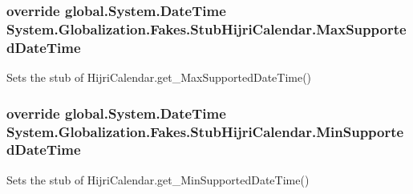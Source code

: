 \hypertarget{class_system_1_1_globalization_1_1_fakes_1_1_stub_hijri_calendar_aabc75d2939465623b6f738a824891f11}{
\subsubsection[{Max\-Supported\-Date\-Time}]{\setlength{\rightskip}{0pt plus 5cm}override global.\-System.\-Date\-Time System.\-Globalization.\-Fakes.\-Stub\-Hijri\-Calendar.\-Max\-Supported\-Date\-Time\hspace{0.3cm}{\ttfamily [get]}}}\label{class_system_1_1_globalization_1_1_fakes_1_1_stub_hijri_calendar_aabc75d2939465623b6f738a824891f11}


Sets the stub of Hijri\-Calendar.\-get\-\_\-\-Max\-Supported\-Date\-Time()

\hypertarget{class_system_1_1_globalization_1_1_fakes_1_1_stub_hijri_calendar_a00b008527d9cc98e5d9318c603c91725}{
\subsubsection[{Min\-Supported\-Date\-Time}]{\setlength{\rightskip}{0pt plus 5cm}override global.\-System.\-Date\-Time System.\-Globalization.\-Fakes.\-Stub\-Hijri\-Calendar.\-Min\-Supported\-Date\-Time\hspace{0.3cm}{\ttfamily [get]}}}\label{class_system_1_1_globalization_1_1_fakes_1_1_stub_hijri_calendar_a00b008527d9cc98e5d9318c603c91725}


Sets the stub of Hijri\-Calendar.\-get\-\_\-\-Min\-Supported\-Date\-Time()

